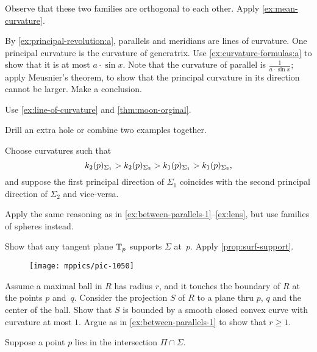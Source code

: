 \begin{multicols}{2}
Observe that these two families are orthogonal to each other.
Apply \ref{ex:mean-curvature}.

By \ref{ex:principal-revolution:a}, parallels and meridians are lines of curvature.
One principal curvature is the curvature of generatrix.
Use \ref{ex:curvature-formulas:a} to show that it is at most $a\cdot \sin x$.
Note that the curvature of parallel is $\tfrac1{a\cdot \sin x}$;
apply Meusnier's theorem, to show that the principal curvature in its direction cannot be larger.
Make a conclusion.

Use \ref{ex:line-of-curvature} and \ref{thm:moon-orginal}.

 Drill an extra hole or combine two examples together.



\setcounter{eqtn}{0}

Choose curvatures such that 
\[k_2(p)_{\Sigma_1}\z>k_2(p)_{\Sigma_2}> k_1(p)_{\Sigma_1}> k_1(p)_{\Sigma_2},\]
and suppose the first principal direction of $\Sigma_1$ coincides with the second principal direction of $\Sigma_2$ and vice-versa.

Apply the same reasoning as in \ref{ex:between-parallels-1}--\ref{ex:lens}, but use families of spheres instead.

Show that any tangent plane $\mathrm{T}_p$ supports $\Sigma$ at~$p$.
Apply \ref{prop:surf-support}.

\begin{wrapfigure}{r}{16 mm}
\vskip-0mm
\centering
\texttt{[image: mppics/pic-1050]}
\vskip-2mm
\end{wrapfigure}

Assume a maximal ball in $R$ has radius $r$, and it touches the boundary of $R$ at the points $p$ and~$q$.
Consider the projection $S$ of $R$ to a plane thru $p$, $q$ and the center of the ball.
Show that $S$ is bounded by a smooth closed convex curve with curvature at most $1$.
Argue as in \ref{ex:between-parallels-1} to
show that $r\ge 1$.

Suppose a point $p$ lies in the intersection $\Pi\cap\Sigma$.


\end{multicols}
